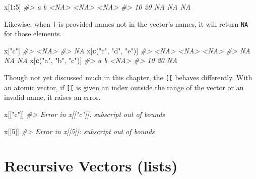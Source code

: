 \documentclass[]{book}
\newenvironment{Shaded}{\begin{snugshade}}{\end{snugshade}}
\newcommand{\CommentTok}[1]{\textcolor[rgb]{0.56,0.35,0.01}{\textit{#1}}}
\newcommand{\DecValTok}[1]{\textcolor[rgb]{0.00,0.00,0.81}{#1}}
\newcommand{\KeywordTok}[1]{\textcolor[rgb]{0.13,0.29,0.53}{\textbf{#1}}}
\newcommand{\NormalTok}[1]{#1}
\newcommand{\OperatorTok}[1]{\textcolor[rgb]{0.81,0.36,0.00}{\textbf{#1}}}
\newcommand{\StringTok}[1]{\textcolor[rgb]{0.31,0.60,0.02}{#1}}
\theoremstyle{plain}
\theoremstyle{remark}
\begin{document}
\begin{Shaded}
\begin{Highlighting}[]
\NormalTok{x[}\DecValTok{1}\OperatorTok{:}\DecValTok{5}\NormalTok{]}
\CommentTok{#>    a    b <NA> <NA> <NA> }
\CommentTok{#>   10   20   NA   NA   NA}
\end{Highlighting}
\end{Shaded}

Likewise, when \texttt{{[}} is provided names not in the vector's names, it will return
\texttt{NA} for those elements.

\begin{Shaded}
\begin{Highlighting}[]
\NormalTok{x[}\StringTok{"c"}\NormalTok{]}
\CommentTok{#> <NA> }
\CommentTok{#>   NA}
\NormalTok{x[}\KeywordTok{c}\NormalTok{(}\StringTok{"c"}\NormalTok{, }\StringTok{"d"}\NormalTok{, }\StringTok{"e"}\NormalTok{)]}
\CommentTok{#> <NA> <NA> <NA> }
\CommentTok{#>   NA   NA   NA}
\NormalTok{x[}\KeywordTok{c}\NormalTok{(}\StringTok{"a"}\NormalTok{, }\StringTok{"b"}\NormalTok{, }\StringTok{"c"}\NormalTok{)]}
\CommentTok{#>    a    b <NA> }
\CommentTok{#>   10   20   NA}
\end{Highlighting}
\end{Shaded}

Though not yet discussed much in this chapter, the \texttt{{[}{[}} behaves differently.
With an atomic vector, if \texttt{{[}{[}} is given an index outside the range of the vector or an invalid name, it raises an error.

\begin{Shaded}
\begin{Highlighting}[]
\NormalTok{x[[}\StringTok{"c"}\NormalTok{]]}
\CommentTok{#> Error in x[["c"]]: subscript out of bounds}
\end{Highlighting}
\end{Shaded}

\begin{Shaded}
\begin{Highlighting}[]
\NormalTok{x[[}\DecValTok{5}\NormalTok{]]}
\CommentTok{#> Error in x[[5]]: subscript out of bounds}
\end{Highlighting}
\end{Shaded}

\hypertarget{recursive-vectors-lists}{%
\section{Recursive Vectors (lists)}\label{recursive-vectors-lists}}
\end{document}

